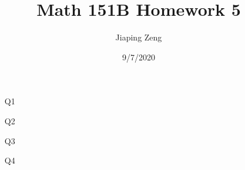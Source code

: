 \documentclass{article}
\title{Math 151B Homework 5}
\date{9/7/2020}
\author{Jiaping Zeng}
\begin{document}
\maketitle

\begin{itemize}
    \item [Q1]
    \item [Q2]
    \item [Q3]
    \item [Q4]
\end{itemize}
\end{document}
